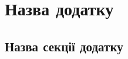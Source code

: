 \documentclass{thesis}
\begin{document}
\appendix

\chapter{Назва додатку}\label{appendix1}

\section{Назва секції додатку}\label{appendix1.1}
\end{document}
